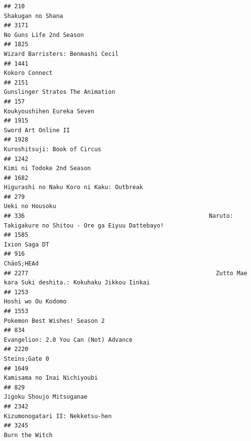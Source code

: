 \documentclass[
]{article}
\begin{document}
\begin{verbatim}
## 210                                                                                          Shakugan no Shana
## 3171                                                                                   No Guns Life 2nd Season
## 1825                                                                         Wizard Barristers: Benmashi Cecil
## 1441                                                                                            Kokoro Connect
## 2151                                                                          Gunslinger Stratos The Animation
## 157                                                                                 Koukyoushihen Eureka Seven
## 1915                                                                                       Sword Art Online II
## 1928                                                                              Kuroshitsuji: Book of Circus
## 1242                                                                                 Kimi ni Todoke 2nd Season
## 1682                                                                  Higurashi no Naku Koro ni Kaku: Outbreak
## 279                                                                                            Ueki no Housoku
## 336                                                     Naruto: Takigakure no Shitou - Ore ga Eiyuu Dattebayo!
## 1585                                                                                             Ixion Saga DT
## 916                                                                                                 ChäoS;HEAd
## 2277                                                      Zutto Mae kara Suki deshita.: Kokuhaku Jikkou Iinkai
## 1253                                                                                        Hoshi wo Ou Kodomo
## 1553                                                                             Pokemon Best Wishes! Season 2
## 834                                                                      Evangelion: 2.0 You Can (Not) Advance
## 2220                                                                                             Steins;Gate 0
## 1649                                                                               Kamisama no Inai Nichiyoubi
## 829                                                                                   Jigoku Shoujo Mitsuganae
## 2342                                                                           Kizumonogatari II: Nekketsu-hen
## 3245                                                                                            Burn the Witch

\end{verbatim}
\end{document}
